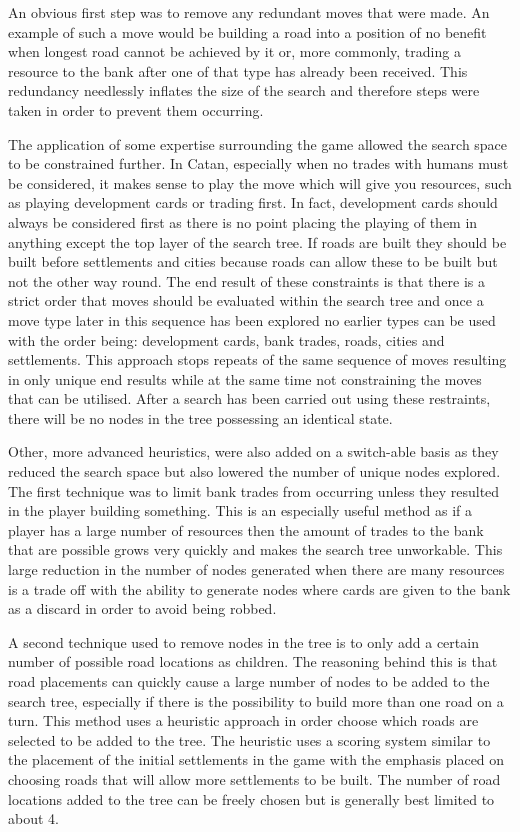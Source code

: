 \documentclass[]{article}
\begin{document}
\par An obvious first step was to remove any redundant moves that were made. An example of such a move would be building a road into a position of no benefit when longest road cannot be achieved by it or, more commonly, trading a resource to the bank after one of that type has already been received. This redundancy needlessly inflates the size of the search and therefore steps were taken in order to prevent them occurring.

\par The application of some expertise surrounding the game allowed the search space to be constrained further. In Catan, especially when no trades with humans must be considered, it makes sense to play the move which will give you resources, such as playing development cards or trading first. In fact, development cards should always be considered first as there is no point placing the playing of them in anything except the top layer of the search tree. If roads are built they should be built before settlements and cities because roads can allow these to be built but not the other way round. The end result of these constraints is that there is a strict order that moves should be evaluated within the search tree and once a move type later in this sequence has been explored no earlier types can be used with the order being: development cards, bank trades, roads, cities and settlements. This approach stops repeats of the same sequence of moves resulting in only unique end results while at the same time not constraining the moves that can be utilised. After a search has been carried out using these restraints, there will be no nodes in the tree possessing an identical state.
 
\par Other, more advanced heuristics, were also added on a switch-able basis as they reduced the search space but also lowered the number of unique nodes explored. The first technique was to limit bank trades from occurring unless they resulted in the player building something. This is an especially useful method as if a player has a large number of resources then the amount of trades to the bank that are possible grows very quickly and makes the search tree unworkable. This large reduction in the number of nodes generated when there are many resources is a trade off with the ability to generate nodes where cards are given to the bank as a discard in order to avoid being robbed.

\par A second technique used to remove nodes in the tree is to only add a certain number of possible road locations as children. The reasoning behind this is that road placements can quickly cause a large number of nodes to be added to the search tree, especially if there is the possibility to build more than one road on a turn. This method uses a heuristic approach in order choose which roads are selected to be added to the tree. The heuristic uses a scoring system similar to the placement of the initial settlements in the game with the emphasis placed on choosing roads that will allow more settlements to be built. The number of road locations added to the tree can be freely chosen but is generally best limited to about 4.
\end{document}

